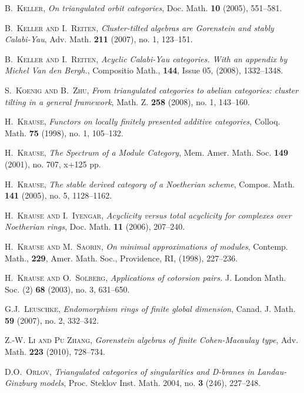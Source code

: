\documentclass[oneside, a4paper,reqno]{amsart}
\numberwithin{equation}{section}
\theoremstyle{definition}
\begin{document}
\begin{thebibliography}{99}
\textsc{B.~Keller}, \textit{On triangulated orbit categories}, Doc.
Math. {\bf 10}  (2005), 551--581.

\textsc{B.~Keller and I.~Reiten}, \textit{Cluster-tilted algebras are
Gorenstein and stably Calabi-Yau},  Adv. Math.  {\bf 211}  (2007),
no. 1, 123--151.

\textsc{B.~Keller and I.~Reiten}, \textit{Acyclic Calabi-Yau categories. With an appendix by Michel Van den Bergh.},
Compositio Math.,  {\bf 144}, Issue 05, (2008), 1332--1348.

\textsc{S.~Koenig and B.~Zhu}, \textit{From triangulated categories to
abelian categories: cluster tilting in a general framework},  Math.
Z. {\bf 258}  (2008),  no. 1, 143--160.

\textsc{H.~Krause}, \textit{Functors on locally finitely presented
additive categories}, Colloq. Math. {\bf 75} (1998), no. 1,
105--132.

\textsc{H.~Krause}, \textit{The Spectrum of a Module Category}, Mem. Amer. Math.
Soc. {\bf 149}  (2001),  no. 707, x+125 pp.

\textsc{H.~Krause}, \textit{The stable derived category of a Noetherian scheme},
Compos. Math.  {\bf 141}  (2005),  no. 5, 1128--1162.

\textsc{H.~Krause and I.~Iyengar}, \textit{Acyclicity versus total
acyclicity for complexes over Noetherian rings}, Doc. Math. {\bf 11}
(2006), 207--240.

\textsc{H.~Krause and M.~Saorin}, \textit{On minimal approximations of
modules}, Contemp. Math., {\bf 229}, Amer. Math. Soc., Providence,
RI, (1998), 227--236.

\textsc{H.~Krause and O.~Solberg}, \textit{Applications of cotorsion
pairs.}  J. London Math. Soc. (2)  {\bf 68}  (2003),  no. 3,
631--650.

\textsc{G.J.~Leuschke}, \textit{Endomorphism rings of finite global
dimension}, Canad. J. Math. {\bf 59} (2007), no. 2, 332--342.

\textsc{Z.-W. Li and Pu Zhang}, \textit{Gorenstein algebras of finite Cohen-Macaulay type},
Adv. Math. {\bf 223} (2010), 728--734.

\textsc{D.O.~Orlov}, \textit{Triangulated categories of singularities
and D-branes in Landau-Ginzburg models},  Proc. Steklov Inst. Math.
2004,  no. {\bf 3} (246), 227--248.


\end{thebibliography}
\end{document}
